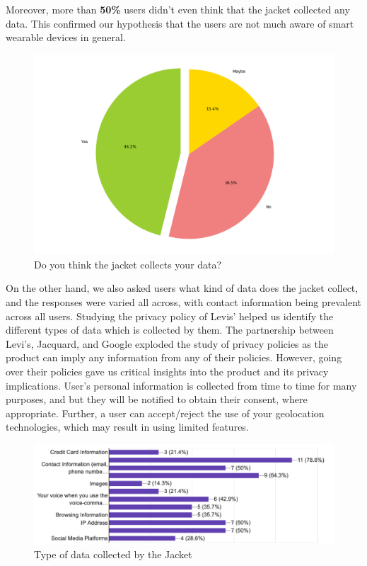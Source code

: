 \documentclass[sigconf]{acmart}
\begin{document}
Moreover, more than \textbf{50\%} users didn't even think that the jacket collected any data. This confirmed our hypothesis that the users are not much aware of smart wearable devices in general.

\begin{figure}[h]
  \centering
  \includegraphics[width=\linewidth]{collect.png}
  \caption{Do you think the jacket collects your data?}
  \label{fig:jacketFour}
  \Description{}
\end{figure}

On the other hand, we also asked users what kind of data does the jacket collect, and the responses were varied all across, with contact information being prevalent across all users. Studying the privacy policy of Levis' helped us identify the different types of data which is collected by them. The partnership between Levi's, Jacquard, and Google exploded the study of privacy policies as the product can imply any information from any of their policies. However, going over their policies gave us critical insights into the product and its privacy implications. User's personal information is collected from time to time for many purposes, and but they will be notified to obtain their consent, where appropriate. Further, a user can accept/reject the use of your geolocation technologies, which may result in using limited features.

\begin{figure}[h]
  \centering
  \includegraphics[width=\linewidth]{type.png}
  \caption{Type of data collected by the Jacket}
  \label{fig:jacketFive}
  \Description{}
\end{figure}
\end{document}
